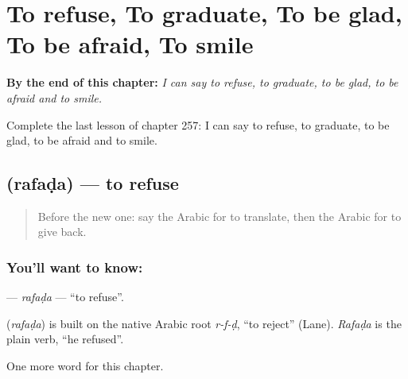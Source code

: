 
\chapter{To refuse, To graduate, To be glad, To be afraid, To smile}
\label{ch:ar-to-refuse-to-graduate-to-be-glad-to-be-afraid-to-smile}

\begin{chapteropening}
\textbf{By the end of this chapter:} \emph{I can say to refuse, to graduate, to be glad, to be afraid and to smile.}

Complete the last lesson of chapter 257: I can say to refuse, to graduate, to be glad, to be afraid and to smile.
\end{chapteropening}

\section[\texorpdfstring{\ar{رفض} (rafaḍa)}{رفض (rafaḍa)}]{ (rafaḍa) — to refuse}

\label{lesson:AR-C257-rafada}



\begin{quote}
Before the new one: say the Arabic for to translate, then the Arabic for to give back.
\end{quote}

\subsection*{You'll want to know: }
\textbf{} — \emph{rafaḍa} — \textquotedblleft{}to refuse\textquotedblright{}.

\begin{cousinweb}
\textbf{} (\emph{rafaḍa}) is built on the native Arabic root \emph{r-f-ḍ}, \textquotedblleft{}to reject\textquotedblright{} (Lane). \emph{Rafaḍa} is the plain verb, \textquotedblleft{}he refused\textquotedblright{}.
\end{cousinweb}

\begin{grammarlens}[title={What you've built}]
One more word for this chapter.
\end{grammarlens}

